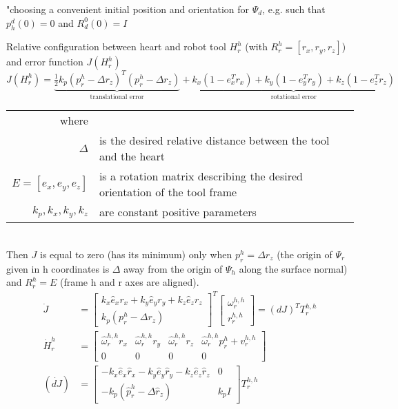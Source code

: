 "choosing a convenient initial position and orientation for $\Psi_d$, e.g. such that $p^d_h(0)=0$ and $R^0_d(0) = I$

Relative configuration between heart and robot tool $H^h_r$ (with $R^h_r =[r_x, r_y, r_z]$) and error function $J(H^h_r)$
\begin{equation}
J(H^h_r) = \underbrace{\tfrac{1}{2}k_p (p^h_r-\Delta r_z)^T(p^h_r-\Delta r_z)}_\text{translational error} + \underbrace{k_x (1-e_x^T r_x) + k_y (1-e_y^T r_y) + k_z (1-e_z^T r_z)}_\text{rotational error}
\end{equation}
\begin{tabular}{rl}
	where &\\
	$\Delta$ & is the desired relative distance between the tool and the heart\\
	$E=[e_x,e_y,e_z]$ & is a rotation matrix describing the desired orientation of the tool frame\\
	$k_p,k_x,k_y,k_z$ & are constant positive parameters\\
\end{tabular}\\

Then $J$ is equal to zero (has its minimum) only when $p^h_r=\Delta r_z$ (the origin of $\Psi_r$ given in h coordinates is $\Delta$ away from the origin of $\Psi_h$ along the surface normal) and $R^h_r=E$ (frame h and r axes are aligned).
\begin{align}
	\dot{J} &= 
	\begin{bmatrix}
		k_x \hat{e}_x r_x + k_y \hat{e}_y r_y + k_z \hat{e}_z r_z\\
		k_p(p^h_r - \Delta r_z)
	\end{bmatrix}^T
	\begin{bmatrix}
		\omega^{h,h}_r \\
		r^{h,h}_r
	\end{bmatrix}
	= (dJ)^T T^{h,h}_r\\
	\dot{H}^h_r &= 
	\begin{bmatrix}
		\hat{\omega}^{h,h}_r r_x & \hat{\omega}^{h,h}_r r_y & \hat{\omega}^{h,h}_r r_z & \hat{\omega}^{h,h}_r p^h_r + v^{h,h}_r\\
		0 & 0 & 0 & 0
	\end{bmatrix}\\
	(\dot{dJ}) &=
	\begin{bmatrix}
		-k_x \hat{e}_x \hat{r}_x  - k_y \hat{e}_y \hat{r}_y - k_z \hat{e}_z \hat{r}_z & 0\\
		-k_p(\hat{p}^h_r - \Delta \hat{r}_z) & k_p I
	\end{bmatrix}
	T^{h,h}_r
\end{align}

